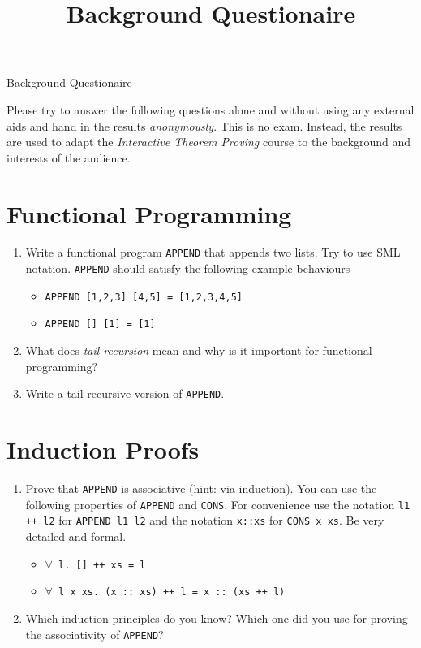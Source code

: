 \documentclass[a4paper,11pt,oneside]{scrartcl}
\title{Background Questionaire}
\begin{document}
\begin{center}
 Background Questionaire
\end{center}
\bigskip


Please try to answer the following questions alone and without using any external aids and hand in the results \emph{anonymously}.
This is no exam.
Instead, the results are used to adapt the \emph{Interactive Theorem Proving} course to the background and interests of the audience.


\section{Functional Programming}

\begin{enumerate}
\item Write a functional program \texttt{APPEND} that appends two lists. 
Try to use SML notation. 
\texttt{APPEND} should satisfy the following example behaviours
\begin{itemize}
\item \texttt{APPEND [1,2,3] [4,5] = [1,2,3,4,5]}
\item \texttt{APPEND [] [1] = [1]}
\end{itemize}

\item What does \emph{tail-recursion} mean and why is it important for functional programming?

\item Write a tail-recursive version of \texttt{APPEND}.
 
\end{enumerate}


\section{Induction Proofs}

\begin{enumerate}
\item Prove that \texttt{APPEND} is associative (hint: via induction). You can use the following
      properties of \texttt{APPEND} and \texttt{CONS}. For convenience use the notation \texttt{l1 ++ l2} for \texttt{APPEND l1 l2} and the notation \texttt{x::xs} for \texttt{CONS x xs}. Be very detailed and formal.

\begin{itemize}
\item \texttt{$\forall$ l.\ [] ++ xs = l}
\item \texttt{$\forall$ l x xs.\ (x ::\ xs) ++ l = x ::\ (xs ++ l)}
\end{itemize}

\item Which induction principles do you know? Which one did you use for proving the associativity of \texttt{APPEND}?

\end{enumerate}
\end{document}
